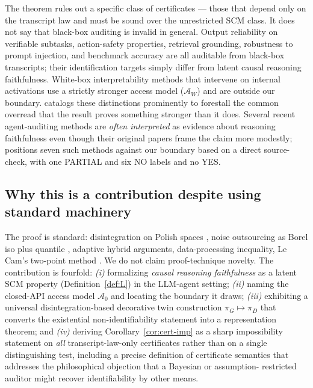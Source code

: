 \documentclass{article}
\theoremstyle{plain}
\theoremstyle{definition}
\theoremstyle{remark}
\begin{document}
The theorem rules out a specific class of certificates --- those that depend
only on the transcript law and must be sound over the unrestricted SCM class.
It does not say that black-box auditing is invalid in general. Output
reliability on verifiable subtasks, action-safety properties, retrieval
grounding, robustness to prompt injection, and benchmark accuracy are all
auditable from black-box transcripts; their identification targets simply
differ from latent causal reasoning faithfulness. White-box interpretability
methods that intervene on internal activations \citep{geiger2022inducing,
geiger2023causal} use a strictly stronger access model ($\mathcal{A}_W$) and
are outside our boundary.  catalogs these distinctions
prominently to forestall the common overread that the result proves
something stronger than it does. Several recent agent-auditing methods are
\emph{often interpreted} as evidence about reasoning faithfulness even though
their original papers frame the claim more modestly; 
positions seven such methods against our boundary based on a direct
source-check, with one PARTIAL and six NO labels and no YES.

\subsection{Why this is a contribution despite using standard machinery}

The proof is standard: disintegration on Polish spaces
\citep{kallenberg2021}, noise outsourcing as Borel iso plus quantile
\citep{kallenberg2021}, adaptive hybrid arguments, data-processing inequality,
Le Cam's two-point method \citep{lecam1986,tsybakov2009}. We do not claim
proof-technique novelty. The contribution is fourfold: \emph{(i)} formalizing
\emph{causal reasoning faithfulness} as a latent SCM property
(Definition~\ref{def:L}) in the LLM-agent setting; \emph{(ii)} naming the
closed-API access model $\mathcal{A}_0$ and locating the boundary it draws;
\emph{(iii)} exhibiting a universal disintegration-based decorative twin
construction $\pi_G \mapsto \pi_D$ that converts the existential
non-identifiability statement into a representation theorem; and \emph{(iv)}
deriving Corollary~\ref{cor:cert-imp} as a sharp impossibility statement on
\emph{all} transcript-law-only certificates rather than on a single
distinguishing test, including a precise definition of certificate semantics
that addresses the philosophical objection that a Bayesian or assumption-
restricted auditor might recover identifiability by other means.
\end{document}
